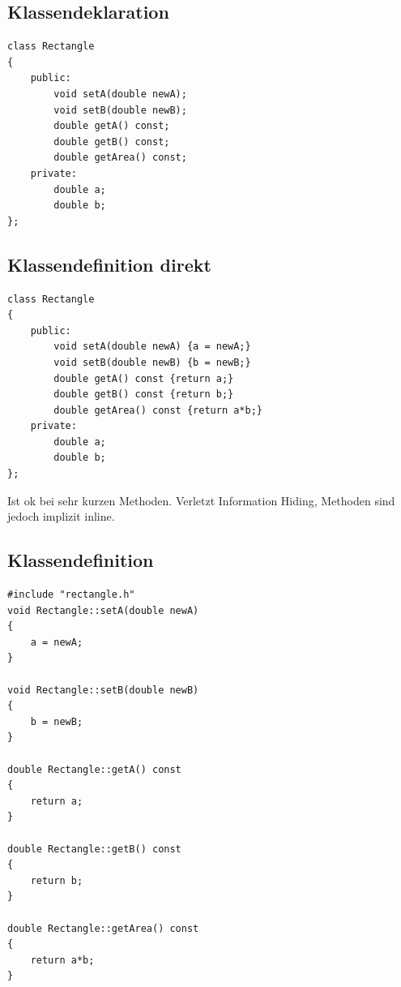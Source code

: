 \begin{multicols}{2}
\subsection{Klassendeklaration}
\vspace{-\baselineskip}
\begin{minipage}{\linewidth}
\begin{lstlisting}
class Rectangle
{
	public:
		void setA(double newA);
		void setB(double newB);
		double getA() const;
		double getB() const;
		double getArea() const;
	private:
		double a;
		double b;
};
\end{lstlisting}
\end{minipage}

\subsection{Klassendefinition direkt}
\vspace{-\baselineskip}
\begin{minipage}{\linewidth}
\begin{lstlisting}
class Rectangle
{
	public:
		void setA(double newA) {a = newA;}
		void setB(double newB) {b = newB;}
		double getA() const {return a;}
		double getB() const {return b;}
		double getArea() const {return a*b;}
	private:
		double a;
		double b;
};
\end{lstlisting}
\end{minipage}
\begin{hinweis}
	Ist ok bei sehr kurzen Methoden. Verletzt Information Hiding, Methoden sind jedoch implizit inline.
\end{hinweis}

\vfill\null
\columnbreak

\subsection{Klassendefinition}
\vspace{-\baselineskip}
\begin{minipage}{\linewidth}
\begin{lstlisting}
#include "rectangle.h"
void Rectangle::setA(double newA)
{
	a = newA;
}

void Rectangle::setB(double newB)
{
	b = newB;
}

double Rectangle::getA() const
{
	return a;
}

double Rectangle::getB() const
{
	return b;
}

double Rectangle::getArea() const
{
	return a*b;
}
\end{lstlisting}	
\end{minipage}
\end{multicols}


